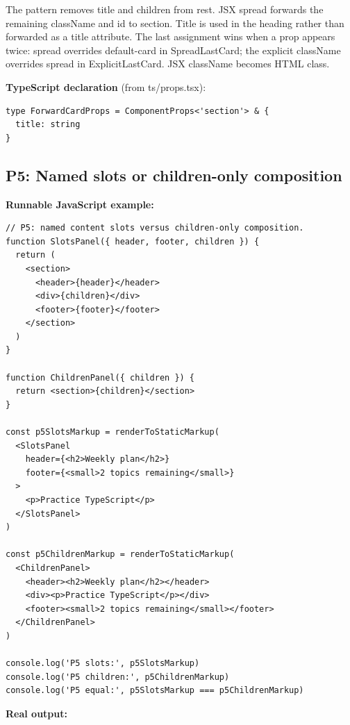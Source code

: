 \documentclass[10pt,a4paper]{article}
\begin{document}
The pattern removes title and children from rest. JSX spread forwards the remaining className and id to section. Title is used in the heading rather than forwarded as a title attribute. The last assignment wins when a prop appears twice: spread overrides default-card in SpreadLastCard; the explicit className overrides spread in ExplicitLastCard. JSX className becomes HTML class.


\textbf{TypeScript declaration} (from ts/props.tsx):

\begin{lstlisting}[language=GuideJS]
type ForwardCardProps = ComponentProps<'section'> & {
  title: string
}
\end{lstlisting}

\subsection{P5: Named slots or children-only composition}

\textbf{Runnable JavaScript example:}

\begin{lstlisting}[language=GuideJS]
// P5: named content slots versus children-only composition.
function SlotsPanel({ header, footer, children }) {
  return (
    <section>
      <header>{header}</header>
      <div>{children}</div>
      <footer>{footer}</footer>
    </section>
  )
}

function ChildrenPanel({ children }) {
  return <section>{children}</section>
}

const p5SlotsMarkup = renderToStaticMarkup(
  <SlotsPanel
    header={<h2>Weekly plan</h2>}
    footer={<small>2 topics remaining</small>}
  >
    <p>Practice TypeScript</p>
  </SlotsPanel>
)

const p5ChildrenMarkup = renderToStaticMarkup(
  <ChildrenPanel>
    <header><h2>Weekly plan</h2></header>
    <div><p>Practice TypeScript</p></div>
    <footer><small>2 topics remaining</small></footer>
  </ChildrenPanel>
)

console.log('P5 slots:', p5SlotsMarkup)
console.log('P5 children:', p5ChildrenMarkup)
console.log('P5 equal:', p5SlotsMarkup === p5ChildrenMarkup)
\end{lstlisting}


\textbf{Real output:}
\end{document}
